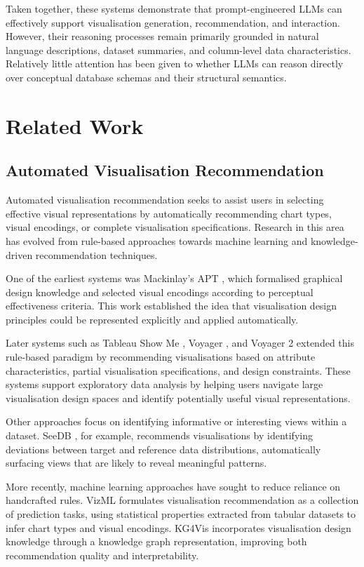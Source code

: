 Taken together, these systems demonstrate that prompt-engineered LLMs can effectively support visualisation generation, recommendation, and interaction. However, their reasoning processes remain primarily grounded in natural language descriptions, dataset summaries, and column-level data characteristics. Relatively little attention has been given to whether LLMs can reason directly over conceptual database schemas and their structural semantics.

\section{Related Work}

\subsection{Automated Visualisation Recommendation}

Automated visualisation recommendation seeks to assist users in selecting effective visual representations by automatically recommending chart types, visual encodings, or complete visualisation specifications. Research in this area has evolved from rule-based approaches towards machine learning and knowledge-driven recommendation techniques.

One of the earliest systems was Mackinlay’s APT \cite{mackinlay1986automating}, which formalised graphical design knowledge and selected visual encodings according to perceptual effectiveness criteria. This work established the idea that visualisation design principles could be represented explicitly and applied automatically.

Later systems such as Tableau Show Me \cite{mackinlay2007show}, Voyager \cite{wongsuphasawat2015voyager}, and Voyager 2 \cite{wongsuphasawat2017voyager} extended this rule-based paradigm by recommending visualisations based on attribute characteristics, partial visualisation specifications, and design constraints. These systems support exploratory data analysis by helping users navigate large visualisation design spaces and identify potentially useful visual representations.

Other approaches focus on identifying informative or interesting views within a dataset. SeeDB \cite{vartak2015seedb}, for example, recommends visualisations by identifying deviations between target and reference data distributions, automatically surfacing views that are likely to reveal meaningful patterns.

More recently, machine learning approaches have sought to reduce reliance on handcrafted rules. VizML \cite{hu2019vizml} formulates visualisation recommendation as a collection of prediction tasks, using statistical properties extracted from tabular datasets to infer chart types and visual encodings. KG4Vis \cite{li2021kg4vis} incorporates visualisation design knowledge through a knowledge graph representation, improving both recommendation quality and interpretability.

